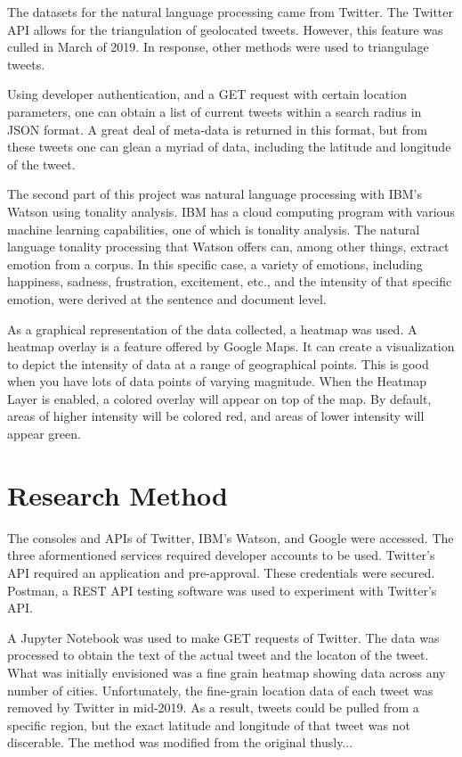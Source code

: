 \documentclass[12pt, oneside]{article}
\begin{document}
The datasets for the natural language processing came from Twitter. The
Twitter API allows for the triangulation of geolocated tweets\cite{TwitterGeo}.
However, this feature was culled in March of 2019. In response, other methods
were used to triangulage tweets.

Using developer authentication, and a GET request with certain location
parameters, one can obtain a list of current tweets within a search radius in
JSON format. A great deal of meta-data is returned in this format, but from
these tweets one can glean a myriad of data, including the latitude and
longitude of the tweet.

The second part of this project was natural language processing with IBM's
Watson using tonality analysis.
IBM has a cloud computing program with various machine learning
capabilities\cite{IBM}, one of which is tonality analysis. The natural language
tonality processing that Watson offers can, among other things, extract emotion
from a corpus. In this specific case, a variety of emotions, including
happiness, sadness, frustration, excitement, etc., and the intensity of that
specific emotion, were derived at the sentence and document level.

As a graphical representation of the data collected, a heatmap was used. A heatmap overlay is a feature offered by Google Maps. It can create a
visualization to depict the intensity of data at a range of geographical points.
This is good when you have lots of data points of varying magnitude.
When the Heatmap Layer is enabled, a colored overlay will appear on top of the
map. By default, areas of higher intensity will be colored red, and areas of
lower intensity will appear green\cite{Google}.

\section{Research Method}
 The consoles and APIs of Twitter, IBM's Watson, and Google were
 accessed. The three aformentioned services required developer accounts to be
 used. Twitter's API required an application and pre-approval. These
 credentials were secured. Postman, a REST API testing software was
 used to experiment with Twitter's API\cite{Postman}.

 A Jupyter Notebook was used to make GET requests of Twitter. The
 data was processed to obtain the text of the actual tweet and the locaton of
 the tweet. What was initially envisioned was a fine grain heatmap showing data
 across any number of cities. Unfortunately, the fine-grain location data of
 each tweet was removed by Twitter in mid-2019. As a result, tweets could be
 pulled from a specific region, but the exact latitude and longitude of that
 tweet was not discerable. The method was modified from the original thusly...
\end{document}
